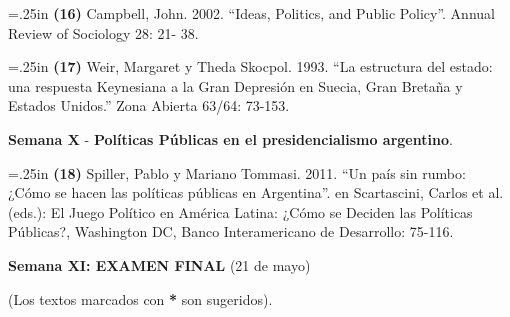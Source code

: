 \documentclass[11pt]{article}
\begin{document}
\hangindent=.25in \noindent\textbf{(16)} Campbell, John. 2002. “Ideas, Politics, and Public Policy”. Annual Review of Sociology 28: 21- 38.

 \hangindent=.25in \noindent\textbf{(17)} Weir, Margaret y Theda Skocpol. 1993. “La estructura del estado: una respuesta Keynesiana a la Gran Depresión en Suecia, Gran Bretaña y Estados Unidos.” Zona Abierta 63/64: 73-153.
 
\vspace{.5cm}
\textbf{Semana X } - \textbf{Políticas Públicas en el presidencialismo argentino}.

\hangindent=.25in \noindent \textbf{(18)} Spiller, Pablo y Mariano Tommasi. 2011. “Un país sin rumbo: ¿Cómo se hacen las políticas públicas en Argentina”. en Scartascini, Carlos et al. (eds.): El Juego Político en América Latina: ¿Cómo se Deciden las Políticas Públicas?, Washington DC, Banco Interamericano de Desarrollo: 75-116.

\textbf{Semana XI: EXAMEN FINAL} (21 de mayo)  

\vspace{2cm}
(Los textos marcados con \textbf{*} son sugeridos). 
\end{document}
